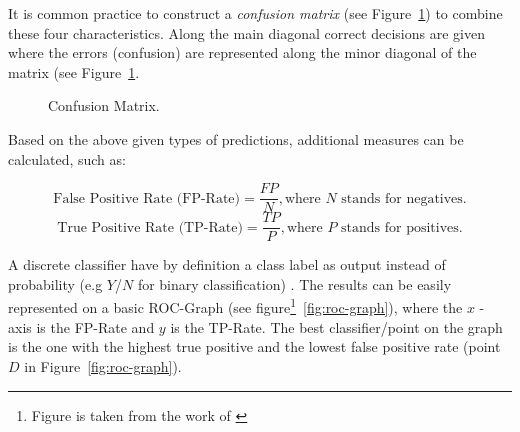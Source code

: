 It is common practice to construct a \textit{confusion matrix} (see Figure~\ref{fig:confusion-matrix}) to combine these four characteristics. Along the main diagonal correct decisions are given where the errors (confusion) are represented along the minor diagonal of the matrix (see Figure~\ref{fig:confusion-matrix}.

\begin{figure}[h!]
    \centering
    \caption{Confusion Matrix.}
    \label{fig:confusion-matrix}
\end{figure}

Based on the above given types of predictions, additional measures can be calculated, such as:

\[ \textrm{False Positive Rate (FP-Rate)} = \frac{FP}{N}, \textrm{where } N \textrm{ stands for negatives.}  \]
\[ \textrm{True Positive Rate (TP-Rate)} = \frac{TP}{P}, \textrm{where } P \textrm{ stands for positives.}  \]


A discrete classifier have by definition a class label as output instead of probability (e.g \(Y\)/\(N\) for binary classification) \cite{Fawcett:2006:IRA:1159473.1159475}. The results can be easily  represented on a basic ROC-Graph (see figure\footnote{Figure is taken from the work of \cite{Fawcett:2006:IRA:1159473.1159475}}~\ref{fig:roc-graph}), where the \(x\) - axis is the FP-Rate and \(y\) is the TP-Rate. The best classifier/point on the graph is the one with the highest true positive and the lowest false positive rate (point \(D\) in Figure~\ref{fig:roc-graph}).

